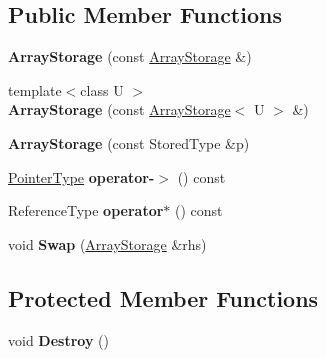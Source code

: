 \subsection*{Public Member Functions}
\begin{DoxyCompactItemize}
\item 
\hypertarget{classLoki_1_1ArrayStorage_ae5f6958adef452f51df8d242093829ec}{}{\bfseries Array\+Storage} (const \hyperlink{classLoki_1_1ArrayStorage}{Array\+Storage} \&)\label{classLoki_1_1ArrayStorage_ae5f6958adef452f51df8d242093829ec}

\item 
\hypertarget{classLoki_1_1ArrayStorage_acd978fdc8bb1be29becfb588fceede6a}{}{\footnotesize template$<$class U $>$ }\\{\bfseries Array\+Storage} (const \hyperlink{classLoki_1_1ArrayStorage}{Array\+Storage}$<$ U $>$ \&)\label{classLoki_1_1ArrayStorage_acd978fdc8bb1be29becfb588fceede6a}

\item 
\hypertarget{classLoki_1_1ArrayStorage_a96da73bed5000f058be86fb0a2456a6d}{}{\bfseries Array\+Storage} (const Stored\+Type \&p)\label{classLoki_1_1ArrayStorage_a96da73bed5000f058be86fb0a2456a6d}

\item 
\hypertarget{classLoki_1_1ArrayStorage_ac460b3550abef73f95bc5e0cdb65c569}{}\hyperlink{classLoki_1_1ArrayStorage_ac1c79b615bc1bfffe6b8b8a4c17ff71a}{Pointer\+Type} {\bfseries operator-\/$>$} () const \label{classLoki_1_1ArrayStorage_ac460b3550abef73f95bc5e0cdb65c569}

\item 
\hypertarget{classLoki_1_1ArrayStorage_a5a2067a34c66c12578994cff90c48f67}{}Reference\+Type {\bfseries operator$\ast$} () const \label{classLoki_1_1ArrayStorage_a5a2067a34c66c12578994cff90c48f67}

\item 
\hypertarget{classLoki_1_1ArrayStorage_a20025aa67b2525a0adf7512fee843b9a}{}void {\bfseries Swap} (\hyperlink{classLoki_1_1ArrayStorage}{Array\+Storage} \&rhs)\label{classLoki_1_1ArrayStorage_a20025aa67b2525a0adf7512fee843b9a}

\end{DoxyCompactItemize}
\subsection*{Protected Member Functions}
\begin{DoxyCompactItemize}
\item 
\hypertarget{classLoki_1_1ArrayStorage_ad1a2c424dd46fc31b51ca0651a642ef2}{}void {\bfseries Destroy} ()\label{classLoki_1_1ArrayStorage_ad1a2c424dd46fc31b51ca0651a642ef2}

\end{DoxyCompactItemize}
